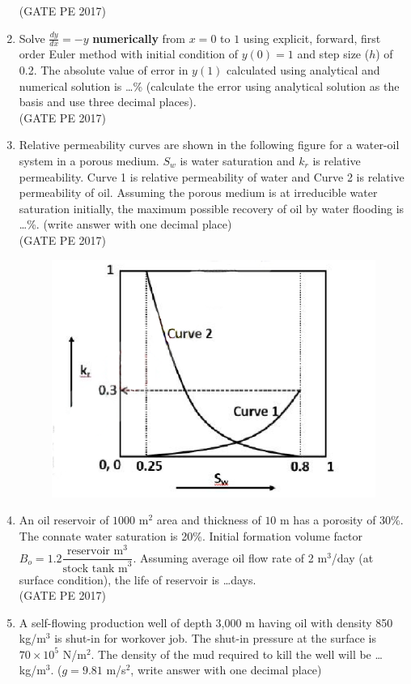 \documentclass[journal,12pt,onecolumn]{IEEEtran}
\theoremstyle{remark}
\begin{document}
\begin{enumerate}
\hfill{(GATE PE 2017)}

\item Solve $ \frac{dy}{dx} = -y$ \textbf{numerically} from $x = 0$ to $1$ using explicit, forward, first order Euler method with initial condition of $y(0) = 1$ and step size ($h$) of 0.2. The absolute value of error in $y(1)$ calculated using analytical and numerical solution is \dots \% (calculate the error using analytical solution as the basis and use three decimal places).\\

\hfill{(GATE PE 2017)}

\item Relative permeability curves are shown in the following figure for a water-oil system in a porous medium. $S_w$ is water saturation and $k_r$ is relative permeability. Curve 1 is relative permeability of water and Curve 2 is relative permeability of oil.
Assuming the porous medium is at irreducible water saturation initially, the maximum possible recovery of oil by water flooding is \dots \%. (write answer with one decimal place)\\

\hfill{(GATE PE 2017)}
\begin{figure}[h]
    \centering
    \includegraphics[width=0.5\columnwidth]{GraphQ_29.png}
\end{figure}

\item An oil reservoir of $1000$ m$^2$ area and thickness of $10$ m has a porosity of 30\%. The connate water saturation is 20\%. Initial formation volume factor $B_o = 1.2 \dfrac{\text{reservoir m}^3}{\text{stock tank m}^3}$. Assuming average oil flow rate of 2 m$^3$/day (at surface condition), the life of reservoir is \dots days.\\

\hfill{(GATE PE 2017)}

\item A self-flowing production well of depth 3,000 m having oil with density 850 kg/m$^3$ is shut-in for workover job. The shut-in pressure at the surface is $70 \times 10^5$ N/m$^2$. The density of the mud required to kill the well will be \dots kg/m$^3$. ($g = 9.81$ m/s$^2$, write answer with one decimal place)\\


\end{enumerate}
\end{document}
